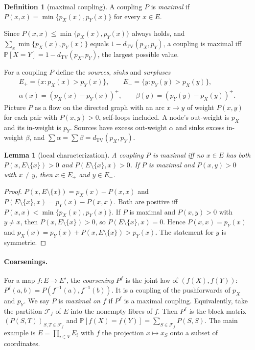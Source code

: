 \documentclass[11pt]{article}
\newtheorem{lemma}[theorem]{Lemma}
\theoremstyle{definition}
\newtheorem{definition}[theorem]{Definition}
\newcommand{\pX}{p_X}
\newcommand{\pY}{p_Y}
\newcommand{\TV}{d_{\mathrm{TV}}}
\newcommand{\Ep}{E_{+}}
\newcommand{\Em}{E_{-}}
\newcommand{\pos}[1]{\left(#1\right)^{+}}
\newcommand{\Var}{V}
\newcommand{\F}{\mathcal{F}}
\renewcommand{\Pr}{\mathbb{P}}
\begin{document}
\begin{definition}[maximal coupling]
A coupling $P$ is \emph{maximal} if $P(x,x)=\min\{\pX(x),\pY(x)\}$ for every $x\in E$.
\end{definition}

Since $P(x,x)\le\min\{\pX(x),\pY(x)\}$ always holds, and
$\sum_x\min\{\pX(x),\pY(x)\}$ equals $1-\TV(\pX,\pY)$, a coupling is maximal iff
$\Pr[X=Y]=1-\TV(\pX,\pY)$, the largest possible value.

For a coupling $P$ define the \emph{sources}, \emph{sinks} and \emph{surpluses}
\begin{gather*}
  \Ep=\{x:\pX(x)>\pY(x)\},\qquad \Em=\{y:\pY(y)>\pX(y)\},\\
  \alpha(x)=\pos{\pX(x)-\pY(x)},\qquad \beta(y)=\pos{\pY(y)-\pX(y)}.
\end{gather*}
Picture $P$ as a flow on the directed graph with an arc $x\to y$ of weight
$P(x,y)$ for each pair with $P(x,y)>0$, self-loops included. A node's out-weight
is $\pX$ and its in-weight is $\pY$. Sources have excess out-weight $\alpha$ and
sinks excess in-weight $\beta$, and $\sum\alpha=\sum\beta=\TV(\pX,\pY)$.

\begin{lemma}[local characterization]\label{lem:local}
A coupling $P$ is maximal iff no $x\in E$ has both $P(x,E\setminus\{x\})>0$ and
$P(E\setminus\{x\},x)>0$. If $P$ is maximal and $P(x,y)>0$ with $x\neq y$, then
$x\in\Ep$ and $y\in\Em$.
\end{lemma}
\begin{proof}
$P(x,E\setminus\{x\})=\pX(x)-P(x,x)$ and $P(E\setminus\{x\},x)=\pY(x)-P(x,x)$. Both
are positive iff $P(x,x)<\min\{\pX(x),\pY(x)\}$. If $P$ is maximal and $P(x,y)>0$
with $y\ne x$, then $P(x,E\setminus\{x\})>0$, so $P(E\setminus\{x\},x)=0$. Hence
$P(x,x)=\pY(x)$ and $\pX(x)=\pY(x)+P(x,E\setminus\{x\})>\pY(x)$. The statement
for $y$ is symmetric.
\end{proof}

\paragraph{Coarsenings.}
For a map $f\colon E\to E'$, the \emph{coarsening} $P^f$ is the joint law of
$(f(X),f(Y))$: $P^f(a,b)=P(f^{-1}(a),f^{-1}(b))$. It is a coupling of the
pushforwards of $\pX$ and $\pY$. We say $P$ is \emph{maximal on $f$} if $P^f$
is a maximal coupling. Equivalently, take the partition $\F_f$ of $E$ into the
nonempty fibres of $f$. Then $P^f$ is the block matrix
$(P(S,T))_{S,T\in\F_f}$ and $\Pr[f(X)=f(Y)]=\sum_{S\in\F_f}P(S,S)$. The main
example is $E=\prod_{i\in\Var}E_i$ with $f$ the projection $x\mapsto x_S$ onto a
subset of coordinates.
\end{document}
